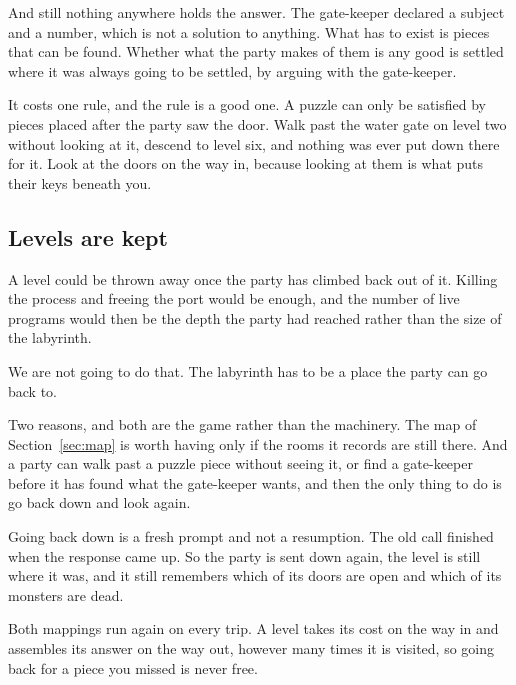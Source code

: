 \documentclass[11pt,a4paper]{article}
\begin{document}
\begin{sectionbox}
And still nothing anywhere holds the answer. The gate-keeper declared a subject and a number, which
is not a solution to anything. What has to exist is pieces that can be found. Whether what the
party makes of them is any good is settled where it was always going to be settled, by arguing
with the gate-keeper.
\end{sectionbox}

It costs one rule, and the rule is a good one. A puzzle can only be satisfied by pieces placed
after the party saw the door. Walk past the water gate on level two without looking at it,
descend to level six, and nothing was ever put down there for it. Look at the doors on the way
in, because looking at them is what puts their keys beneath you.

\subsection{Levels are kept}
\label{sec:kept}

A level could be thrown away once the party has climbed back out of it. Killing the process and
freeing the port would be enough, and the number of live programs would then be the depth the
party had reached rather than the size of the labyrinth.

We are not going to do that. The labyrinth has to be a place the party can go back to.

Two reasons, and both are the game rather than the machinery. The map of Section~\ref{sec:map} is
worth having only if the rooms it records are still there. And a party can walk past a puzzle
piece without seeing it, or find a gate-keeper before it has found what the gate-keeper wants, and then the
only thing to do is go back down and look again.

Going back down is a fresh prompt and not a resumption. The old call finished when the response
came up. So the party is sent down again, the level is still where it was, and it still remembers
which of its doors are open and which of its monsters are dead.

\begin{sectionbox}
Both mappings run again on every trip. A level takes its cost on the way in and assembles its
answer on the way out, however many times it is visited, so going back for a piece you missed is
never free.
\end{sectionbox}

\newpage
\end{document}
